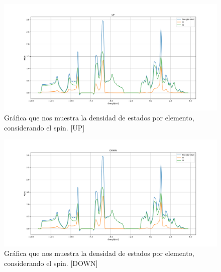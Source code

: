 \begin{figure}[H]
    \centering
    \includegraphics[scale=0.38]{images_silicano/Densidad_estados_con_spin_up_elementos.png}
    \caption{Gráfica que nos muestra la densidad de estados por elemento, considerando el spin. [UP]}
\end{figure}

\begin{figure}[H]
    \centering
    \includegraphics[scale=0.38]{images_silicano/Densidad_estados_con_spin_down_elementos.png}
    \caption{Gráfica que nos muestra la densidad de estados por elemento, considerando el spin. [DOWN]}
\end{figure}

\newpage